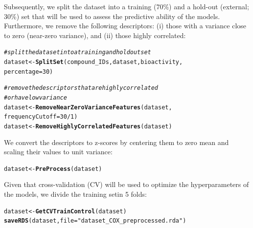 \documentclass[twoside,a4wide,12pt]{article}\usepackage[]{graphicx}\usepackage[]{color}
\makeatletter
\newcommand{\hlnum}[1]{\textcolor[rgb]{0.686,0.059,0.569}{#1}}%
\newcommand{\hlstr}[1]{\textcolor[rgb]{0.192,0.494,0.8}{#1}}%
\newcommand{\hlcom}[1]{\textcolor[rgb]{0.678,0.584,0.686}{\textit{#1}}}%
\newcommand{\hlopt}[1]{\textcolor[rgb]{0,0,0}{#1}}%
\newcommand{\hlstd}[1]{\textcolor[rgb]{0.345,0.345,0.345}{#1}}%
\newcommand{\hlkwb}[1]{\textcolor[rgb]{0.69,0.353,0.396}{#1}}%
\newcommand{\hlkwc}[1]{\textcolor[rgb]{0.333,0.667,0.333}{#1}}%
\newcommand{\hlkwd}[1]{\textcolor[rgb]{0.737,0.353,0.396}{\textbf{#1}}}%
\newenvironment{kframe}{%
 \def\at@end@of@kframe{}%
 \ifinner\ifhmode%
  \def\at@end@of@kframe{\end{minipage}}%
  \begin{minipage}{\columnwidth}%
 \fi\fi%
 \def\FrameCommand##1{\hskip\@totalleftmargin \hskip-\fboxsep
 \colorbox{shadecolor}{##1}\hskip-\fboxsep
     \hskip-\linewidth \hskip-\@totalleftmargin \hskip\columnwidth}%
 \MakeFramed {\advance\hsize-\width
   \@totalleftmargin\z@ \linewidth\hsize
   \@setminipage}}%
 {\par\unskip\endMakeFramed%
 \at@end@of@kframe}
\newenvironment{knitrout}{}{} %
\makeatother
\begin{document}
Subsequently, we split the dataset into a training (70\%) and a hold-out (external; 30\%) set that will be used to assess the predictive ability of the models. Furthermore, we remove the following descriptors: (i) those with a variance close to zero (near-zero variance), and (ii) those highly correlated:
\begin{knitrout}
\color{fgcolor}\begin{kframe}
\begin{alltt}
\hlcom{# split the dataset into a training and holdout set}
\hlstd{dataset} \hlkwb{<-} \hlkwd{SplitSet}\hlstd{(compound_IDs, dataset, bioactivity,}
    \hlkwc{percentage} \hlstd{=} \hlnum{30}\hlstd{)}

\hlcom{# remove the descriptors that are highly correlated}
\hlcom{# or have low variance}
\hlstd{dataset} \hlkwb{<-} \hlkwd{RemoveNearZeroVarianceFeatures}\hlstd{(dataset,}
    \hlkwc{frequencyCutoff} \hlstd{=} \hlnum{30}\hlopt{/}\hlnum{1}\hlstd{)}
\hlstd{dataset} \hlkwb{<-} \hlkwd{RemoveHighlyCorrelatedFeatures}\hlstd{(dataset)}
\end{alltt}
\end{kframe}
\end{knitrout}


We convert the descriptors to z-scores by centering them to zero mean and scaling their values to unit variance:
\begin{knitrout}
\color{fgcolor}\begin{kframe}
\begin{alltt}
\hlstd{dataset} \hlkwb{<-} \hlkwd{PreProcess}\hlstd{(dataset)}
\end{alltt}
\end{kframe}
\end{knitrout}


Given that cross-validation (CV) will be used to optimize the hyperparameters of the models, we divide the training setin 5 folds:
\begin{knitrout}
\color{fgcolor}\begin{kframe}
\begin{alltt}
\hlstd{dataset} \hlkwb{<-} \hlkwd{GetCVTrainControl}\hlstd{(dataset)}
\hlkwd{saveRDS}\hlstd{(dataset,} \hlkwc{file} \hlstd{=} \hlstr{"dataset_COX_preprocessed.rda"}\hlstd{)}
\end{alltt}
\end{kframe}
\end{knitrout}
\end{document}
